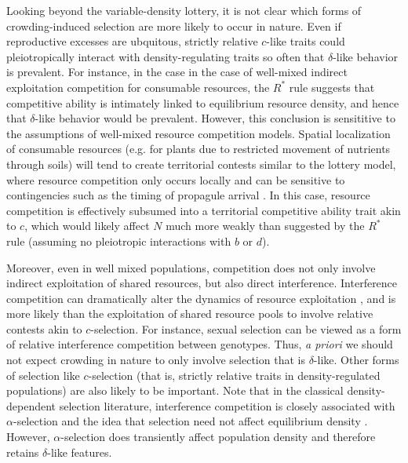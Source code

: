 \documentclass[12pt]{article}
\begin{document}
Looking beyond the variable-density lottery, it is not clear which forms of crowding-induced selection are more likely to occur in nature. Even if reproductive excesses are ubquitous, strictly relative $c$-like traits could pleiotropically interact with density-regulating traits so often that $\delta$-like behavior is prevalent. For instance, in the case in the case of well-mixed indirect exploitation competition for consumable resources, the $R^*$ rule suggests that competitive ability is intimately linked to equilibrium resource density, and hence that $\delta$-like behavior would be prevalent. However, this conclusion is sensititive to the assumptions of well-mixed resource competition models. Spatial localization of consumable resources (e.g. for plants due to restricted movement of nutrients through soils) will tend to create territorial contests similar to the lottery model, where resource competition only occurs locally and can be sensitive to contingencies such as the timing of propagule arrival \citep{bolker_99}. In this case, resource competition is effectively subsumed into a territorial competitive ability trait akin to $c$, which would likely affect $N$ much more weakly than suggested by the $R^*$ rule (assuming no pleiotropic interactions with $b$ or $d$). 

Moreover, even in well mixed populations, competition does not only involve indirect exploitation of shared resources, but also direct interference. Interference competition can dramatically alter the dynamics of resource exploitation \citep{case_1974,amarasekare_2002}, and is more likely than the exploitation of shared resource pools to involve relative contests akin to $c$-selection. For instance, sexual selection can be viewed as a form of relative interference competition between genotypes. Thus, \textit{a priori} we should not expect crowding in nature to only involve selection that is $\delta$-like. Other forms of selection like $c$-selection (that is, strictly relative traits in density-regulated populations) are also likely to be important. Note that in the classical density-dependent selection literature, interference competition is closely associated with $\alpha$-selection and the idea that selection need not affect equilibrium density \citep{gill_1974}. However, $\alpha$-selection does transiently affect population density and therefore retains $\delta$-like features.
\end{document}
